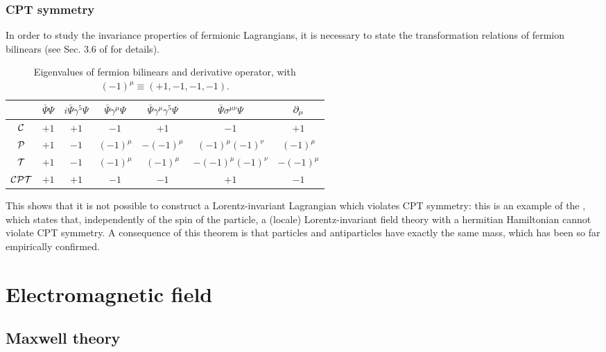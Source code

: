 \subsubsection{CPT symmetry}

In order to study the invariance properties of fermionic Lagrangians, it is necessary to state the transformation relations of fermion bilinears (see Sec. 3.6 of \cite{peskin} for details).

\begin{table}
  \centering
  \begin{tabular}{ccccccc}
    \hline
    \rule{0pt}{2.5ex} & $ \bar{\Psi} \Psi $ & $ i \bar{\Psi} \gamma^5 \Psi $ & $ \bar{\Psi} \gamma^\mu \Psi $ & $ \bar{\Psi} \gamma^\mu \gamma^5 \Psi $ & $ \bar{\Psi} \sigma^{\mu \nu} \Psi $ & $ \partial_\mu $ \\
    \hline
    \rule{0pt}{2.5ex} $ \mathcal{C} $ & $ +1 $ & $ +1 $ & $ -1 $ & $ +1 $ & $ -1 $ & $ +1 $ \\
    \rule{0pt}{2.5ex} $ \mathcal{P} $ & $ +1 $ & $ -1 $ & $ (-1)^\mu $ & $ - (-1)^\mu $ & $ (-1)^\mu (-1)^\nu $ & $ (-1)^\mu $ \\
    \rule{0pt}{2.5ex} $ \mathcal{T} $ & $ +1 $ & $ -1 $ & $ (-1)^\mu $ & $ (-1)^\mu $ & $ - (-1)^\mu (-1)^\nu $ & $ - (-1)^\mu $ \\
    \rule{0pt}{2.5ex} $ \mathcal{C}\mathcal{P}\mathcal{T} $ & $ +1 $ & $ +1 $ & $ -1 $ & $ -1 $ & $ +1 $ & $ -1 $
  \end{tabular}
  \caption{Eigenvalues of fermion bilinears and derivative operator, with $ (-1)^\mu \equiv (+1,-1,-1,-1) $.}
  \label{tab:ferm-bil-eigen}
\end{table}

This shows that it is not possible to construct a Lorentz-invariant Lagrangian which violates CPT symmetry: this is an example of the , which states that, independently of the spin of the particle, a (locale) Lorentz-invariant field theory with a hermitian Hamiltonian cannot violate CPT symmetry.
A consequence of this theorem is that particles and antiparticles have exactly the same mass, which has been so far empirically confirmed.

\section{Electromagnetic field}

\subsection{Maxwell theory}

